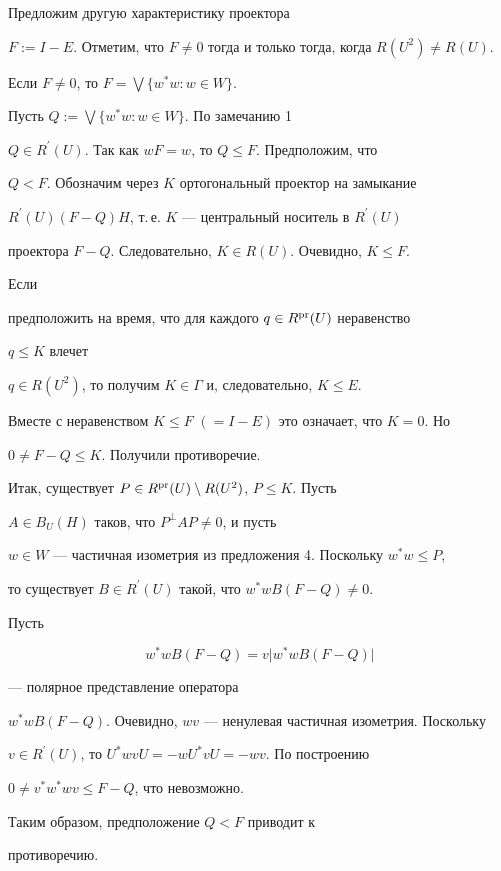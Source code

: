 Предложим другую характеристику проектора


$F:=I-E$. Отметим, что $F\ne 0$ тогда и только тогда, когда $R(U^{2})\ne 


R(U)$.





\begin{prop}


Если $F\ne 0$, то $F=\bigvee\{w^{*}w :w\in W\}$.


\end{prop}





\begin{pf}


Пусть $Q:=\bigvee\{w^{*}w :w\in W\}$. По замечанию 1\;


$Q\in R^{\prime}(U).$ Так как $wF=w$, то $Q\leq F$. Предположим, что


$Q<F$. Обозначим через $K$ ортогональный проектор на замыкание


$R^{\prime}(U)(F-Q)H$, т.\,е. $K$ --- центральный носитель в $R^{\prime}(U)$


проектора $F-Q$. Следовательно, $K\in R(U)$. Очевидно, $K\leq F$.





Если


предположить на время, что для каждого $q\in R^{\operatorname{pr}}(U)$ неравенство


$q\leq K$ влечет


$q\in R(U^{2})$, то получим $K\in \Gamma$ и, следовательно, $K\leq E$.


Вместе с неравенством $K\leq F$ $(=I-E)$ это означает, что $K=0$. Но


$0\ne F-Q\leq K$. Получили противоречие.





Итак, существует $P\in R^{\operatorname{pr}}(U)\setminus R(U^{2})$, $P\leq K$. Пусть


$A\in B_{U}(H)$ таков, что $P^{\perp}AP\ne 0$, и пусть


$w\in W$ --- частичная изометрия из предложения 4. Поскольку $w^{*}w\leq P$,


то существует $B\in R^{\prime}(U)$ такой, что $w^{*}wB(F-Q)\ne 0$.


Пусть


$$


w^{*}wB(F-Q)=v\vert w^{*}wB(F-Q)\vert


$$


--- полярное представление оператора


$w^{*}wB(F-Q)$. Очевидно, $wv$ --- ненулевая частичная изометрия. Поскольку


$v\in R^{\prime}(U)$, то $U^{*}wvU=-wU^{*}vU=-wv$. По построению


$0\ne v^{*}w^{*}wv\leq F-Q$, что невозможно.


Таким образом, предположение $Q<F$ приводит к


противоречию.


\end{pf}





